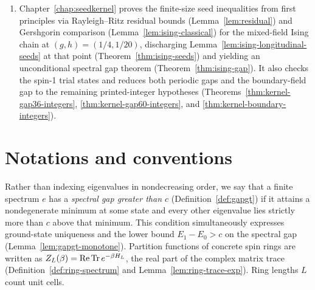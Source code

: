 \begin{enumerate}
    \ref{thm:two-leg-ising-gap}, \ref{thm:ising-longitudinal-gap}, \ref{thm:staggered-physical-gap},
    \ref{thm:dimerized-physical-gap}, and~\ref{thm:ladder-physical-gap}).
  \item Chapter~\ref{chap:seedkernel} proves the finite-size seed inequalities from first
    principles via Rayleigh--Ritz residual bounds (Lemma~\ref{lem:residual}) and Gershgorin
    comparison (Lemma~\ref{lem:ising-classical}) for the mixed-field Ising chain at
    \((g, h) = (1/4, 1/20)\), discharging Lemma~\ref{lem:ising-longitudinal-seeds} at that point
    (Theorem~\ref{thm:ising-seeds}) and yielding an unconditional spectral gap theorem
    (Theorem~\ref{thm:ising-gap}). It also checks the spin-1 trial states and reduces both
    periodic gaps and the boundary-field gap to the remaining printed-integer hypotheses
    (Theorems~\ref{thm:kernel-gap36-integers}, \ref{thm:kernel-gap60-integers}, and
    \ref{thm:kernel-boundary-integers}).
\end{enumerate}

\section{Notations and conventions}

Rather than indexing eigenvalues in nondecreasing order, we say that a finite spectrum \(e\) has a
\emph{spectral gap greater than \(c\)} (Definition~\ref{def:gapgt}) if it attains a nondegenerate
minimum at some state and every other eigenvalue lies strictly more than \(c\) above that minimum.
This condition simultaneously expresses ground-state uniqueness and the lower bound
\(E_1 - E_0 > c\) on the spectral gap (Lemma~\ref{lem:gapgt-monotone}). Partition functions of
concrete spin rings are written as \(Z_L(\beta) = \operatorname{Re}\operatorname{Tr} e^{-\beta H_L}\), the real
part of the complex matrix trace (Definition~\ref{def:ring-spectrum} and
Lemma~\ref{lem:ring-trace-exp}). Ring lengths \(L\) count unit cells.


